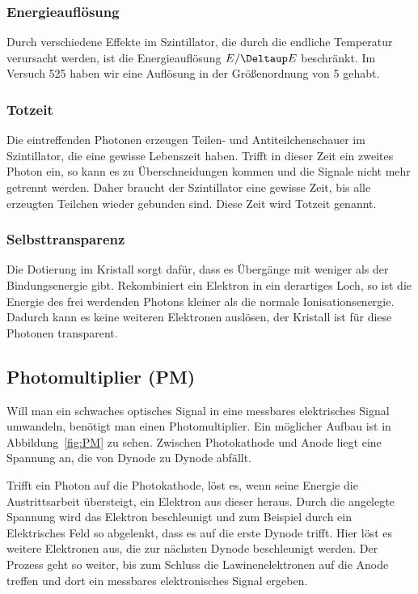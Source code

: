 \documentclass[11pt, ngerman, fleqn, DIV=15, headinclude, BCOR=2cm]{scrreprt}
\begin{document}
\subsubsection{Energieauflösung}

Durch verschiedene Effekte im Szintillator, die durch die endliche Temperatur
verursacht werden, ist die Energieauflösung $E/\Deltaup E$ beschränkt. Im
Versuch 525 haben wir eine Auflösung in der Größenordnung von 5 gehabt.

\subsubsection{Totzeit}

Die eintreffenden Photonen erzeugen Teilen- und Antiteilchenschauer im
Szintillator, die eine gewisse Lebenszeit haben. Trifft in dieser Zeit ein
zweites Photon ein, so kann es zu Überschneidungen kommen und die Signale nicht
mehr getrennt werden. Daher braucht der Szintillator eine gewisse Zeit, bis
alle erzeugten Teilchen wieder gebunden sind. Diese Zeit wird Totzeit genannt.

\subsubsection{Selbsttransparenz}

Die Dotierung im Kristall sorgt dafür, dass es Übergänge mit weniger als der
Bindungsenergie gibt. Rekombiniert ein Elektron in ein derartiges Loch, so ist
die Energie des frei werdenden Photons kleiner als die normale
Ionisationsenergie. Dadurch kann es keine weiteren Elektronen auslösen, der
Kristall ist für diese Photonen transparent.

\subsection{Photomultiplier (PM)}

Will man ein schwaches optisches Signal in eine messbares elektrisches Signal
umwandeln, benötigt man einen Photomultiplier. Ein möglicher Aufbau ist in
Abbildung~\ref{fig:PM} zu sehen. Zwischen Photokathode und Anode liegt eine
Spannung an, die von Dynode zu Dynode abfällt.

Trifft ein Photon auf die Photokathode, löst es, wenn seine Energie die
Austrittsarbeit übersteigt, ein Elektron aus dieser heraus. Durch die angelegte
Spannung wird das Elektron beschleunigt und zum Beispiel durch ein Elektrisches
Feld so abgelenkt, dass es auf die erste Dynode trifft. Hier löst es weitere
Elektronen aus, die zur nächsten Dynode beschleunigt werden. Der Prozess geht
so weiter, bis zum Schluss die Lawinenelektronen auf die Anode treffen und dort
ein messbares elektronisches Signal ergeben.
\end{document}
